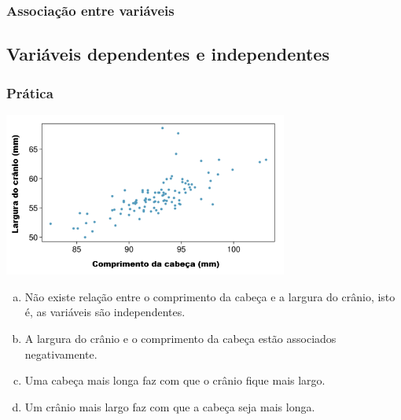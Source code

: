 \begin{frame}
\frametitle{Associação entre variáveis}



\end{frame}





\subsection{Variáveis dependentes e independentes}


\begin{frame}
\frametitle{Prática}

{
}
{
\includegraphics[width=0.7\textwidth]{1-2_data_basics/possum_head_skull.png}
}

\begin{enumerate}[(a)]
\justifying
\item Não existe relação entre o comprimento da cabeça e a largura do crânio, isto é, as variáveis são independentes.
\justifying
{}
\justifying
\item A largura do crânio e o comprimento da cabeça estão associados negativamente.
\justifying
\item Uma cabeça mais longa faz com que o crânio fique mais largo.
\justifying
\item Um crânio mais largo faz com que a cabeça seja mais longa.
\end{enumerate}

\end{frame}

